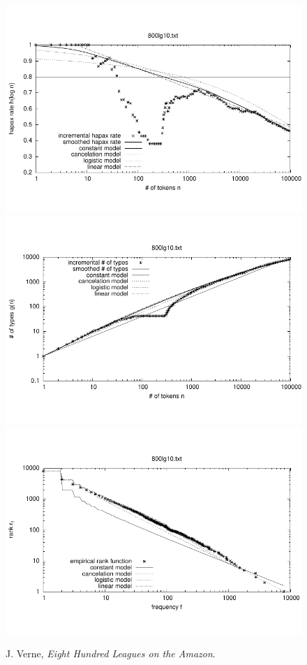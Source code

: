 \documentclass[a4paper,12pt]{article}
\begin{document}

\begin{figure}[p]
  \centering
  \vspace{-2em}
  \includegraphics[width=0.8\columnwidth]{output/herdan/800lg10_27/token_ratio.pdf}
  \\[-3em]
  \includegraphics[width=0.8\columnwidth]{output/herdan/800lg10_27/token_type.pdf}
  \\[-3em]
  \includegraphics[width=0.8\columnwidth]{output/herdan/800lg10_27/frequency_rank.pdf}
  \vspace{-2em}
  \caption{J. Verne, \emph{Eight Hundred Leagues on the
      Amazon}.\label{fig800lg10F}}
\end{figure}
\end{document}
